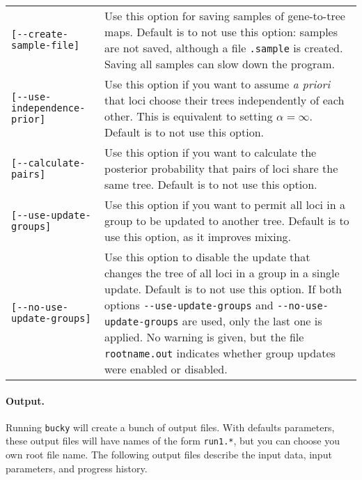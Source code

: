\documentclass[12pt,english,final,letterpaper]{article}
\begin{document}
\hspace*{-1in}
\begin{tabular}{l|p{4.7in}}
\verb+[--create-sample-file]+&Use this option for saving samples of gene-to-tree maps.
Default is to {\sc not} use this option: samples are not saved, although a file
{\tt .sample} is created. Saving all samples can slow down the program.\\
\verb+[--use-independence-prior]+&Use this option if you want to assume {\it a priori}
that loci choose their trees independently of each other. This is equivalent
to setting $\alpha=\infty$. Default is to {\sc not} use this option.\\
\verb+[--calculate-pairs]+&Use this option if you want to calculate the 
posterior probability that pairs of loci share the same tree. Default is 
to {\sc not} use this option.\\
\verb+[--use-update-groups]+&Use this option if you want to permit all loci 
in a group to be updated to another tree. Default is to use this option, as 
it improves mixing.\\
\verb+[--no-use-update-groups]+&Use this option to disable the update that 
changes the tree of all loci in a group in a single update. Default is to 
{\sc not} use this option. If both options \verb+--use-update-groups+ and 
\verb+--no-use-update-groups+ are used, only the last one is applied. 
No warning is given, but the file {\tt rootname.out} indicates
whether group updates were enabled or disabled.\\
\end{tabular}


\paragraph{Output.}
Running {\tt bucky} will create a bunch of output files. With defaults 
parameters, these output files will have names of the form {\tt run1.*}, 
but you can choose you own root file name.
The following output files describe the input data, input parameters, and
progress history.
\bigskip
\end{document}
